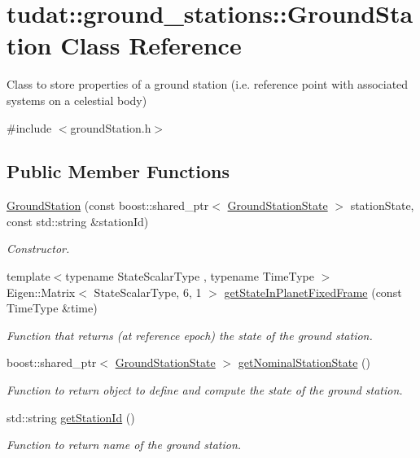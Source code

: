 \hypertarget{classtudat_1_1ground__stations_1_1GroundStation}{}\section{tudat\+:\+:ground\+\_\+stations\+:\+:Ground\+Station Class Reference}
\label{classtudat_1_1ground__stations_1_1GroundStation}


Class to store properties of a ground station (i.\+e. reference point with associated systems on a celestial body)  




{\ttfamily \#include $<$ground\+Station.\+h$>$}

\subsection*{Public Member Functions}
\begin{DoxyCompactItemize}
\item 
\hyperlink{classtudat_1_1ground__stations_1_1GroundStation_a8df54bbd81d9794ba72c71aef7508f57}{Ground\+Station} (const boost\+::shared\+\_\+ptr$<$ \hyperlink{classtudat_1_1ground__stations_1_1GroundStationState}{Ground\+Station\+State} $>$ station\+State, const std\+::string \&station\+Id)
\begin{DoxyCompactList}\small\item\em Constructor. \end{DoxyCompactList}\item 
{\footnotesize template$<$typename State\+Scalar\+Type , typename Time\+Type $>$ }\\Eigen\+::\+Matrix$<$ State\+Scalar\+Type, 6, 1 $>$ \hyperlink{classtudat_1_1ground__stations_1_1GroundStation_a59db63cb3b4693ebedd3a7fa8c340503}{get\+State\+In\+Planet\+Fixed\+Frame} (const Time\+Type \&time)
\begin{DoxyCompactList}\small\item\em Function that returns (at reference epoch) the state of the ground station. \end{DoxyCompactList}\item 
boost\+::shared\+\_\+ptr$<$ \hyperlink{classtudat_1_1ground__stations_1_1GroundStationState}{Ground\+Station\+State} $>$ \hyperlink{classtudat_1_1ground__stations_1_1GroundStation_ac653b3dea042e94d210f4f9af5b8bdf4}{get\+Nominal\+Station\+State} ()
\begin{DoxyCompactList}\small\item\em Function to return object to define and compute the state of the ground station. \end{DoxyCompactList}\item 
std\+::string \hyperlink{classtudat_1_1ground__stations_1_1GroundStation_a00509a759dba9a0470fca4d143c3ccf4}{get\+Station\+Id} ()
\begin{DoxyCompactList}\small\item\em Function to return name of the ground station. \end{DoxyCompactList}\end{DoxyCompactItemize}


